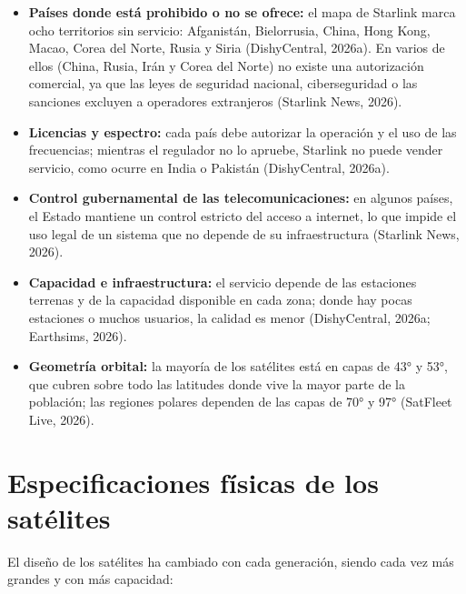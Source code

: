 \documentclass[12pt,letterpaper]{article}
\begin{document}
\begin{itemize}[nosep]
    \item \textbf{Países donde está prohibido o no se ofrece:} el mapa de Starlink marca ocho territorios sin servicio: Afganistán, Bielorrusia, China, Hong Kong, Macao, Corea del Norte, Rusia y Siria (DishyCentral, 2026a). En varios de ellos (China, Rusia, Irán y Corea del Norte) no existe una autorización comercial, ya que las leyes de seguridad nacional, ciberseguridad o las sanciones excluyen a operadores extranjeros (Starlink News, 2026).
    \item \textbf{Licencias y espectro:} cada país debe autorizar la operación y el uso de las frecuencias; mientras el regulador no lo apruebe, Starlink no puede vender servicio, como ocurre en India o Pakistán (DishyCentral, 2026a).
    \item \textbf{Control gubernamental de las telecomunicaciones:} en algunos países, el Estado mantiene un control estricto del acceso a internet, lo que impide el uso legal de un sistema que no depende de su infraestructura (Starlink News, 2026).
    \item \textbf{Capacidad e infraestructura:} el servicio depende de las estaciones terrenas y de la capacidad disponible en cada zona; donde hay pocas estaciones o muchos usuarios, la calidad es menor (DishyCentral, 2026a; Earthsims, 2026).
    \item \textbf{Geometría orbital:} la mayoría de los satélites está en capas de 43° y 53°, que cubren sobre todo las latitudes donde vive la mayor parte de la población; las regiones polares dependen de las capas de 70° y 97° (SatFleet Live, 2026).
\end{itemize}

\section{Especificaciones físicas de los satélites}

El diseño de los satélites ha cambiado con cada generación, siendo cada vez más grandes y con más capacidad:
\end{document}
